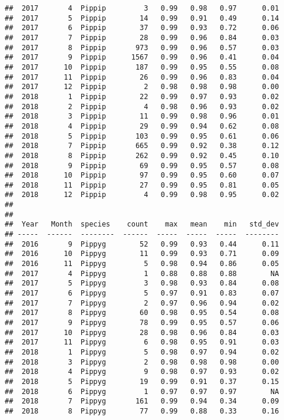 \documentclass[]{article}
\begin{document}
\begin{verbatim}
##  2017       4  Pippip         3   0.99   0.98   0.97      0.01
##  2017       5  Pippip        14   0.99   0.91   0.49      0.14
##  2017       6  Pippip        37   0.99   0.93   0.72      0.06
##  2017       7  Pippip        28   0.99   0.96   0.84      0.03
##  2017       8  Pippip       973   0.99   0.96   0.57      0.03
##  2017       9  Pippip      1567   0.99   0.96   0.41      0.04
##  2017      10  Pippip       187   0.99   0.95   0.55      0.08
##  2017      11  Pippip        26   0.99   0.96   0.83      0.04
##  2017      12  Pippip         2   0.98   0.98   0.98      0.00
##  2018       1  Pippip        22   0.99   0.97   0.93      0.02
##  2018       2  Pippip         4   0.98   0.96   0.93      0.02
##  2018       3  Pippip        11   0.99   0.98   0.96      0.01
##  2018       4  Pippip        29   0.99   0.94   0.62      0.08
##  2018       5  Pippip       103   0.99   0.95   0.61      0.06
##  2018       7  Pippip       665   0.99   0.92   0.38      0.12
##  2018       8  Pippip       262   0.99   0.92   0.45      0.10
##  2018       9  Pippip        69   0.99   0.95   0.57      0.08
##  2018      10  Pippip        97   0.99   0.95   0.60      0.07
##  2018      11  Pippip        27   0.99   0.95   0.81      0.05
##  2018      12  Pippip         4   0.99   0.98   0.95      0.02
## 
## 
##  Year   Month  species    count    max   mean    min   std_dev
## -----  ------  --------  ------  -----  -----  -----  --------
##  2016       9  Pippyg        52   0.99   0.93   0.44      0.11
##  2016      10  Pippyg        11   0.99   0.93   0.71      0.09
##  2016      11  Pippyg         5   0.98   0.94   0.86      0.05
##  2017       4  Pippyg         1   0.88   0.88   0.88        NA
##  2017       5  Pippyg         3   0.98   0.93   0.84      0.08
##  2017       6  Pippyg         5   0.97   0.91   0.83      0.07
##  2017       7  Pippyg         2   0.97   0.96   0.94      0.02
##  2017       8  Pippyg        60   0.98   0.95   0.54      0.08
##  2017       9  Pippyg        78   0.99   0.95   0.57      0.06
##  2017      10  Pippyg        28   0.98   0.96   0.84      0.03
##  2017      11  Pippyg         6   0.98   0.95   0.91      0.03
##  2018       1  Pippyg         5   0.98   0.97   0.94      0.02
##  2018       3  Pippyg         2   0.98   0.98   0.98      0.00
##  2018       4  Pippyg         9   0.98   0.97   0.93      0.02
##  2018       5  Pippyg        19   0.99   0.91   0.37      0.15
##  2018       6  Pippyg         1   0.97   0.97   0.97        NA
##  2018       7  Pippyg       161   0.99   0.94   0.34      0.09
##  2018       8  Pippyg        77   0.99   0.88   0.33      0.16

\end{verbatim}
\end{document}
